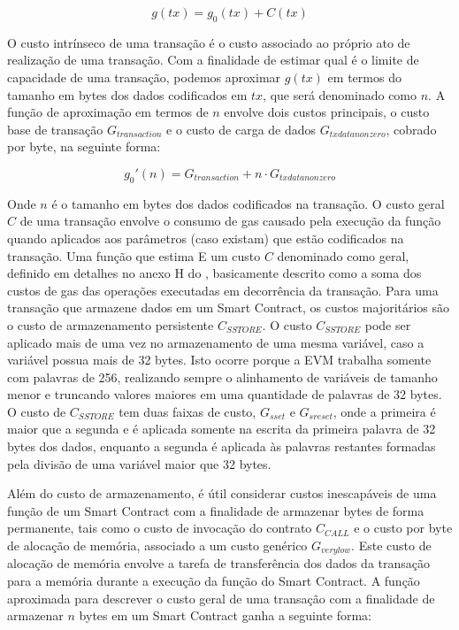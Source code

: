 \documentclass[a4paper,11pt]{article}
\begin{document}
\[ g(tx) = g_{0}(tx) + C(tx) \]

O custo intrínseco de uma transação é o custo associado ao próprio ato de realização de uma transação.
Com a finalidade de estimar qual é o limite de capacidade de uma transação, podemos aproximar $g(tx)$ em termos do tamanho em bytes dos dados codificados em $tx$, que será denominado como $n$.
A função de aproximação em termos de $n$ envolve dois custos principais, o custo base de transação $G_{transaction}$ e o custo de carga de dados $G_{txdatanonzero}$, cobrado por byte, na seguinte forma:

\[ g_{0}'(n) = G_{transaction} + n \cdot G_{txdatanonzero} \]

Onde $n$ é o tamanho em bytes dos dados codificados na transação.
O custo geral $C$ de uma transação envolve o consumo de gas causado pela execução da função quando aplicados aos parâmetros (caso existam) que estão codificados na transação.
Uma função que estima
E um custo $C$ denominado como geral, definido em detalhes no anexo H do , basicamente descrito como a soma dos custos de gas das operações executadas em decorrência da transação.
Para uma transação que armazene dados em um Smart Contract, os custos majoritários são o custo de armazenamento
persistente $C_{SSTORE}$.
O custo $C_{SSTORE}$ pode ser aplicado mais de uma vez no armazenamento de uma mesma variável, caso a variável possua mais de 32 bytes.
Isto ocorre porque a EVM trabalha somente com palavras de 256, realizando sempre o alinhamento de variáveis de tamanho menor e truncando valores maiores em uma quantidade de palavras de 32 bytes.
O custo de $C_{SSTORE}$ tem duas faixas de custo, $G_{sset}$ e $G_{sreset}$, onde a primeira é maior que a segunda e é aplicada somente na escrita da primeira palavra de 32 bytes dos dados, enquanto a segunda é aplicada às palavras restantes formadas pela divisão de uma variável maior que 32 bytes.


Além do custo de armazenamento, é útil considerar custos inescapáveis de uma função de um Smart Contract com a finalidade de armazenar bytes de forma permanente, tais como o custo de invocação do contrato $C_{CALL}$ e o custo por byte de alocação de memória, associado a um custo genérico $G_{verylow}$.
Este custo de alocação de memória envolve a tarefa de transferência dos dados da transação para a memória durante a execução da função do Smart Contract.
A função aproximada para descrever o custo geral de uma transação com a finalidade de armazenar $n$ bytes em um Smart Contract ganha a seguinte forma:
\end{document}
